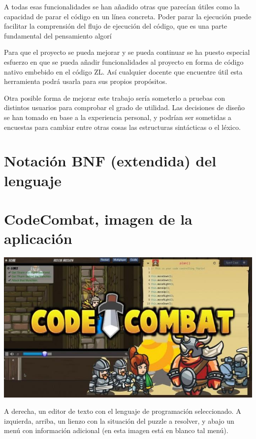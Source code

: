 \documentclass{report}
\begin{document}
	A todas esas funcionalidades se han añadido otras que parecían útiles como la capacidad de parar el código en un línea concreta. Poder parar la ejecución puede facilitar la comprensión del flujo de ejecución del código, que es una parte fundamental del pensamiento algorí 
	
	Para que el proyecto se pueda mejorar y se pueda continuar se ha puesto especial esfuerzo en que se pueda añadir funcionalidades al proyecto en forma de código nativo embebido en el código ZL. Así cualquier docente que encuentre útil esta herramienta podrá usarla para sus propios propósitos. 
	
	Otra posible forma de mejorar este trabajo sería someterlo a pruebas con distintos usuarios para comprobar el grado de utilidad. Las decisiones de diseño se han tomado en base a la experiencia personal, y podrían ser sometidas a encuestas para cambiar entre otras cosas las estructuras sintácticas o el léxico. 
	 
	
	 
	
	

	\appendix
	\chapter{Notación BNF (extendida) del lenguaje} \label{app:a}
	
	
	\chapter{CodeCombat, imagen de la aplicación} \label{app:b}
	
	\begin{center}
	\includegraphics[width=1\linewidth]{codecombat}
	
	A derecha, un editor de texto con el lenguaje de programación seleccionado. A izquierda, arriba, un lienzo con la situación del puzzle a resolver, y abajo un menú con información adicional (en esta imagen está en blanco tal menú).
	\end{center}
	
\end{document}
